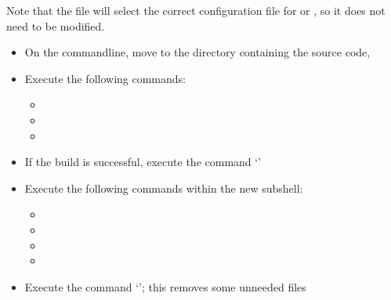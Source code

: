Note that the file  will select the correct
configuration file for \osx{} or \win{}, so it does not need to be modified.
\begin{itemize}
\item On the command\longDash{}line, move to the directory containing the \mplusm{} source
code, 
\item\exSp{}Execute the following commands:
\begin{itemize}
\item{}
\item\exSp{}
\item\exSp{}
\end{itemize}
\item\exSp{}If the build is successful, execute the command `'
\item\exSp{}Execute the following commands within the new subshell:
\begin{itemize}
\item{}
\item\exSp{}
\item\exSp{}
\item\exSp{}
\end{itemize}
\item\exSp{}Execute the command `'; this removes some
unneeded files
\end{itemize}
\tertiaryEnd
{}
